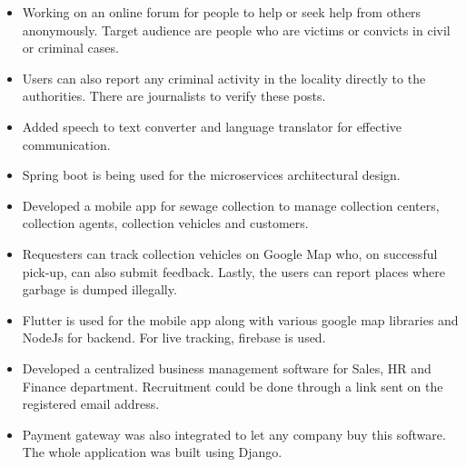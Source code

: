 \begin{justify}




\begin{itemize}
    \item Working on an online forum for people to help or seek help from others anonymously. Target audience are people who are victims or convicts in civil or criminal cases. 
    \item Users can also report any criminal activity in the locality directly to the authorities. There are journalists to verify these posts.
    \item Added speech to text converter and language translator for effective communication.
    \item Spring boot is being used for the microservices architectural design.
\end{itemize}
\medskip



\begin{itemize}
    \item Developed a mobile app for sewage collection to manage collection centers, collection agents, collection vehicles and customers.
    \item Requesters can track collection vehicles on Google Map who, on successful pick-up, can also submit feedback. Lastly, the users can report places where garbage is dumped illegally.
    
  \item Flutter is used for the mobile app along with various google map libraries and NodeJs for backend. For live tracking, firebase is used.

\end{itemize}
\medskip


\begin{itemize}
  \item Developed a centralized business management software for Sales, HR and Finance department. Recruitment could be done through a link sent on the registered email address.
  \item  Payment gateway was also integrated to let any company buy this software.  The whole application was built using Django.
\end{itemize}
\medskip


\end{justify}
